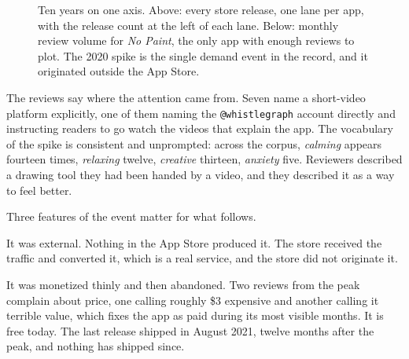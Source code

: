 \documentclass[10pt,letterpaper,twocolumn]{article}
\begin{document}
\begin{figure}[t]
\caption{Ten years on one axis. Above: every store release, one lane per app, with the release count at the left of each lane. Below: monthly review volume for \emph{No Paint}, the only app with enough reviews to plot. The 2020 spike is the single demand event in the record, and it originated outside the App Store.}
\label{fig:timeline}
\end{figure}

The reviews say where the attention came from. Seven name a short-video
platform explicitly, one of them naming the \texttt{@whistlegraph}
account directly and instructing readers to go watch the videos that
explain the app. The vocabulary of the spike is consistent and
unprompted: across the corpus, \emph{calming} appears fourteen times,
\emph{relaxing} twelve, \emph{creative} thirteen, \emph{anxiety} five.
Reviewers described a drawing tool they had been handed by a video, and
they described it as a way to feel better.

Three features of the event matter for what follows.

It was external. Nothing in the App Store produced it. The store received
the traffic and converted it, which is a real service, and the store did
not originate it.

It was monetized thinly and then abandoned. Two reviews from the peak
complain about price, one calling roughly \$3 expensive and another
calling it terrible value, which fixes the app as paid during its most
visible months. It is free today. The last release shipped in August
2021, twelve months after the peak, and nothing has shipped since.
\end{document}
